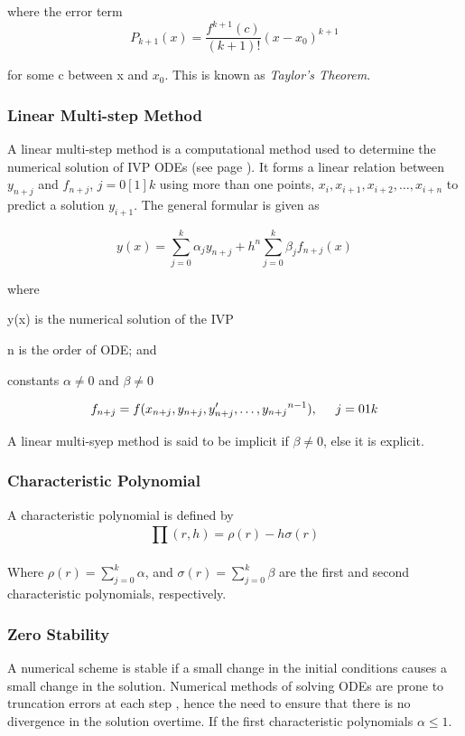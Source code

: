 \documentclass[12pt]{article}
\begin{document}
	\noindent where the error term \begin{equation}
	P_{k+1}(x)=\frac{f^{k+1}(c)}{(k+1)!}(x-x_0)^{k+1}
	\end{equation}
	
	\noindent for some c between x and $x_0$. This is known as \textit{Taylor's Theorem}.
	
	
	\subsubsection{Linear Multi-step Method}
	A linear multi-step method is a computational method used to determine the numerical solution of IVP ODEs (see page \pageref{sec: Problems of ODE}). It forms a linear relation between $y_{n+j}$ and $f_{n+j}$, $j = 0[1]k$ using more than one points, $x_i,x_{i+1}, x_{i+2}, \dots, x_{i+n}$ to predict a solution $y_{i+1}$. The general formular is given as 

	\begin{equation}
	y(x) = \sum_{j=0}^{k}\alpha_jy_{n+j}+h^n\sum_{j=0}^{k}\beta_jf_{n+j}(x)
	\end{equation}
	
	\noindent where
	
	y(x) is the numerical solution of the IVP
	
	n is the order of ODE; and
	
	constants $\alpha \neq 0$ and $\beta \neq 0$ 

	$$f_{n+j} = f(x_{n+j}, y_{n+j}, y'_{n+j}, \dots, {y_{n+j}}^{n-1}), \hspace{5mm} j=0{1}k$$

	\medskip
	\noindent A linear multi-syep method is said to be implicit if $\beta\neq0$, else it is explicit.
	
	\subsubsection{Characteristic Polynomial}
	A characteristic polynomial is defined by
	\begin{equation}
	\prod_{}^{}(r,h)=\rho(r)-h\sigma(r)
	\end{equation}

	\noindent Where
	$\rho(r) = \sum_{j=0}^{k} \alpha$, and  $\sigma(r) = \sum_{j=0}^{k} \beta$ are the first and second characteristic polynomials, respectively.

	\subsubsection{Zero Stability}
	A numerical scheme is stable if a small change in the initial conditions causes a small change in the solution. Numerical methods of solving ODEs are prone to truncation errors at each step , hence the need to ensure that there is no divergence in the solution overtime. If the first characteristic polynomials $\alpha\leq1.$ 
	
\end{document}
